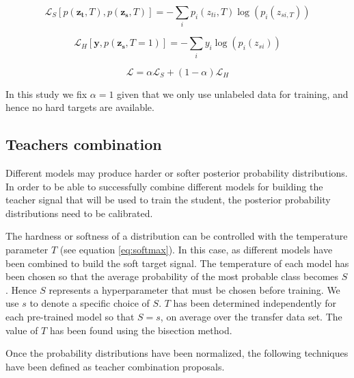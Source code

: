 \documentclass{elsarticle}
\begin{document}
	\begin{equation}
	\mathcal{L}_S\left[p( \mathbf{z_t}, T), p(\mathbf{z_s}, T) \right] = -\sum_i p_i(z_{ti}, T) \log \left(p_i(z_{si, T})\right)
	\label{eq:ced}
	\end{equation}
	
	\begin{equation}
	\mathcal{L}_{H}\left[\mathbf{y}, p(\mathbf{z_s}, T=1) \right] = -\sum_i y_i \log \left(p_i(z_{si})\right)
	\label{eq:ces}
	\end{equation}
	
	\begin{equation}
	\mathcal{L} = \alpha \mathcal{L}_S + (1-\alpha) \mathcal{L}_{H}
	\label{eq:loss_distillation}
	\end{equation}
	
	In this study we fix $\alpha=1$ given that we only use unlabeled data for training, and hence no hard targets are available.
	
	\subsection{Teachers combination} \label{sec:teachers_comb}
	 Different models may produce harder or softer posterior probability distributions. In order to be able to successfully combine  different models for building the teacher signal that will be used to train the student, the posterior probability distributions need to be calibrated. 
	 
	 The hardness or softness of a distribution can be controlled with the temperature parameter $T$ (see equation \ref{eq:softmax}). In this case, as different models have been combined to build the soft target signal. The temperature of each model has been chosen so that the average probability of the most probable class becomes $S$. Hence $S$ represents a hyperparameter that must be chosen before training. We use $s$ to denote a specific choice of $S$.  $T$ has been determined independently for each pre-trained model so that $S=s$, on average over the transfer data set. The value of $T$ has been found using the bisection method.
	 
	 Once the probability distributions have been normalized, the following techniques have been defined as teacher combination proposals.
	 
\end{document}
